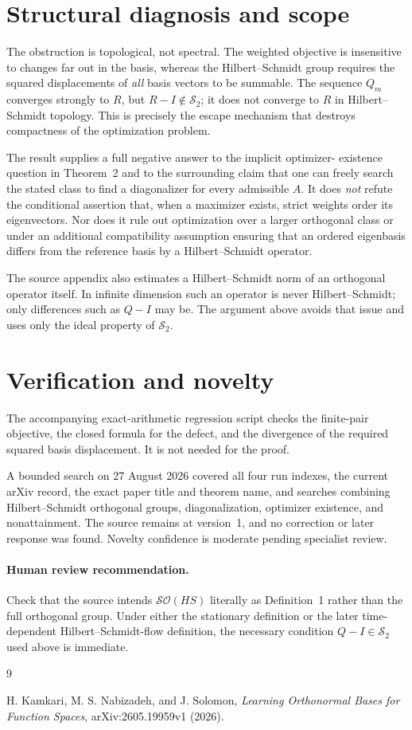 \documentclass[11pt]{article}
\newcommand{\HS}{\mathcal S_2}
\begin{document}
\section{Structural diagnosis and scope}

The obstruction is topological, not spectral.  The weighted objective is
insensitive to changes far out in the basis, whereas the Hilbert--Schmidt
group requires the squared displacements of \emph{all} basis vectors to be
summable.  The sequence $Q_m$ converges strongly to $R$, but
$R-I\notin\HS$; it does not converge to $R$ in Hilbert--Schmidt topology.
This is precisely the escape mechanism that destroys compactness of the
optimization problem.

The result supplies a full negative answer to the implicit optimizer-
existence question in Theorem~2 and to the surrounding claim that one can
freely search the stated class to find a diagonalizer for every admissible
$A$.  It does \emph{not} refute the conditional assertion that, when a
maximizer exists, strict weights order its eigenvectors.  Nor does it rule
out optimization over a larger orthogonal class or under an additional
compatibility assumption ensuring that an ordered eigenbasis differs from
the reference basis by a Hilbert--Schmidt operator.

The source appendix also estimates a Hilbert--Schmidt norm of an orthogonal
operator itself.  In infinite dimension such an operator is never
Hilbert--Schmidt; only differences such as $Q-I$ may be.  The argument above
avoids that issue and uses only the ideal property of $\HS$.

\section{Verification and novelty}

The accompanying exact-arithmetic regression script checks the finite-pair
objective, the closed formula for the defect, and the divergence of the
required squared basis displacement.  It is not needed for the proof.

A bounded search on 27 August 2026 covered all four run indexes, the current
arXiv record, the exact paper title and theorem name, and searches combining
Hilbert--Schmidt orthogonal groups, diagonalization, optimizer existence, and
nonattainment.  The source remains at version~1, and no correction or later
response was found.  Novelty confidence is moderate pending specialist
review.

\paragraph{Human review recommendation.}
Check that the source intends $\mathcal{SO}(HS)$ literally as Definition~1
rather than the full orthogonal group.  Under either the stationary
definition or the later time-dependent Hilbert--Schmidt-flow definition,
the necessary condition $Q-I\in\HS$ used above is immediate.

\begin{thebibliography}{9}
\raggedright
{}
H. Kamkari, M. S. Nabizadeh, and J. Solomon,
\emph{Learning Orthonormal Bases for Function Spaces},
arXiv:2605.19959v1 (2026).
\end{thebibliography}
\end{document}
